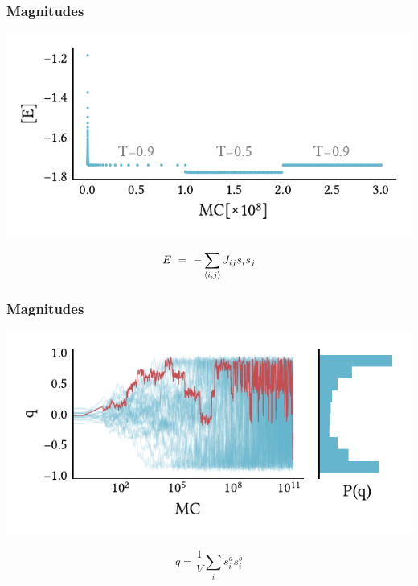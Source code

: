 \documentclass{beamer}
\begin{document}
\begin{frame}
  \frametitle{Magnitudes}
  \pause
  \begin{center}
    \includegraphics{../study_cases/energy_in_protocol/energyprotocol_beamer.pdf}
  \end{center}
    \begin{equation*}
      E \ = \  - \sum_{\expval{i,j}} J_{ij} s_i s_j
    \end{equation*}
\end{frame}

\begin{frame}
  \frametitle{Magnitudes}
  \begin{center}
    \includegraphics{../study_cases/overlap/overlap_beamer.pdf}
  \end{center}
  \begin{equation*}
    q = \frac{1}{V} \sum_{i} s_i^a s_i^b
  \end{equation*}
\end{frame}
\end{document}
